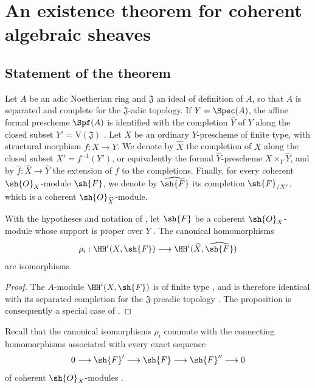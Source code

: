 \section{An existence theorem for coherent algebraic sheaves}
\label{section:III.5}


\subsection{Statement of the theorem}
\label{subsection:III.5.1}

\begin{env}[5.1.1]
\label{III.5.1.1}
Let $A$ be an adic Noetherian ring and $\mathfrak{J}$ an ideal of
definition of $A$, so that $A$ is separated and complete for the
$\mathfrak{J}$-adic topology.  If $Y=\Spec(A)$, the affine formal
prescheme $\Spf(A)$ is identified with the completion
$\widehat{Y}$ of $Y$ along the closed subset
$Y'=\mathrm{V}(\mathfrak{J})$ .  Let $X$ be an
ordinary $Y$-prescheme of finite type, with structural morphism
$f:X\to Y$.  We denote by $\widehat{X}$ the completion of $X$ along
the closed subset $X'=f^{-1}(Y')$, or equivalently the formal
$\widehat{Y}$-prescheme $X\times_Y\widehat{Y}$, and by
$\widehat{f}:\widehat{X}\to\widehat{Y}$ the extension of $f$ to the
completions.  Finally, for every coherent $\sh{O}_X$-module
$\sh{F}$, we denote by $\widehat{\sh{F}}$ its completion
$\sh{F}_{/X'}$, which is a coherent
$\sh{O}_{\widehat{X}}$-module.
\end{env}

\begin{proposition}[5.1.2]
\label{III.5.1.2}
With the hypotheses and notation of , let $\sh{F}$
be a coherent $\sh{O}_X$-module whose support is proper over $Y$
.  The canonical homomorphisms
\[
  \rho_i:
  \HH^i(X,\sh{F})
  \longrightarrow
  \HH^i(\widehat{X},\widehat{\sh{F}})
\]
are isomorphisms.
\end{proposition}

\begin{proof}
The $A$-module $\HH^i(X,\sh{F})$ is of finite type
, and is therefore identical with its separated
completion for the $\mathfrak{J}$-preadic topology
.  The proposition is consequently a special case
of .
\end{proof}

Recall that the canonical isomorphisms $\rho_i$ commute with the
connecting homomorphisms associated with every exact sequence
\[
  0\longrightarrow\sh{F}'
  \longrightarrow\sh{F}
  \longrightarrow\sh{F}''
  \longrightarrow0
\]
of coherent $\sh{O}_X$-modules
 .

